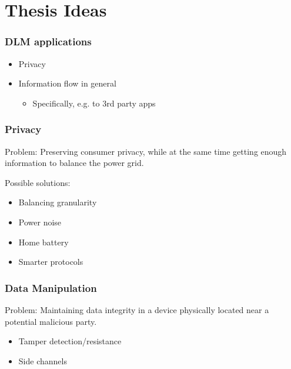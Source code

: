 
\section{Thesis Ideas}

\begin{frame}
  \frametitle{DLM applications}

  \begin{itemize}
    \item Privacy
    \item Information flow in general
    \begin{itemize}
      \item Specifically, e.g. to 3rd party apps
    \end{itemize}
  \end{itemize}
\end{frame}

\begin{frame}
  \frametitle{Privacy}

  Problem: Preserving consumer privacy, while at the same time getting enough information to balance the power grid.

  Possible solutions:
  \begin{itemize}
    \item Balancing granularity
    \item Power noise
    \item Home battery
    \item Smarter protocols
  \end{itemize}
\end{frame}

\begin{frame}
  \frametitle{Data Manipulation}

  Problem: Maintaining data integrity in a device physically located near a potential malicious party.

  \begin{itemize}
    \item Tamper detection/resistance
    \item Side channels
  \end{itemize}
\end{frame}
